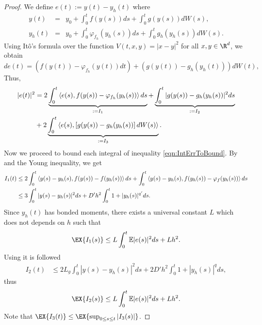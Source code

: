 \begin{proof}
	We define $e(t):= y(t)-y_h(t)$ where
	\begin{eqnarray*}
		y(t) &=& y_0 + \int_{0}^t f(y(s))ds + \int_{0}^t g(y(s))dW(s),  \nonumber\\
		y_h(t) &=& y_0 + \int_{0}^t \varphi_{f_h}(y_h(s))ds + \int_{0}^t 
		g_h(y_h(s))dW(s).\nonumber
	\end{eqnarray*}
	Using It\^{o}'s formula over the function $V(t,x,y) = |x-y|^2$ for all  $x,y\in \R^d$, we obtain 
$$
		d e(t) = 
		\left(
			f(y(t)) - \varphi_{f_h}(y(t)) dt
		\right)
		+
		\left(
			g(y(t)) - g_h(y_h(t))
		\right) dW(t),
	$$
	Thus,
	\begin{align} \label{eqn:IntErrToBound}
		|e(t)|^2 
		&=
			2 \underbrace{\int_{0}^t
				\left\langle e(s), f(y(s))-\varphi_{f_h}(y_h(s))\right\rangle ds }_{:=I_1}
			+
			\underbrace{\int_{0}^t
				|g(y(s)) - g_h(y_h(s))|^2 ds }_{:=I_2}\notag\\
		&+
			2 \underbrace{\int_{0}^t
				\left\langle e(s), \left[ g(y(s))-g_h(y_h(s)) \right] dW(s)\right\rangle}_{:=I_3}.	\end{align}
	Now we proceed to bound each integral of inequality \eqref{eqn:IntErrToBound}. 
	By  and the Young inequality, we get
	\begin{align*}
		I_1(t) 
		&\leq
			2\int_0^t
				\innerprod{y(s) - y_h(s)}{f(y(s))-f(y_h(s))} ds
			+
			 \int_0^t
				 \innerprod{y(s) - y_h(s)}{f(y_h(s))-\varphi_{f}(y_h(s))} ds \notag\\
%	
		&\leq
			3\int_0^t
				|y(s) - y_h(s)|^2ds
			+ D' h^2 
			\int_0^t
				1 + |y_h(s)|^{q'} ds.
	\end{align*}
	Since $y_h(t)$ has bonded moments, there exists a universal constant $L$ which does not depends on $h$ 
	such that
	\begin{equation}\label{eqn:I1Bound} 
		 \EX{
			 I_1(s)	
		 }
		 \leq
			 L\int_{0}^t
				\m{|e(s)|^2} ds
		+ L h^2.
	 \end{equation}
	Using   it is followed
	\begin{align*}
		I_2(t) 
		&\leq
			2 L_g 
			\int_{0}^t
				|y(s) - y_h(s)|^2 ds
			+
			2D'h^2
			\int_0^t
				1 + |y_h(s)|^q ds, 	 
	\end{align*}
	thus
	\begin{equation} \label{t5}
		\EX{
			I_2(s)	
		}
		\leq
		L\int_{0}^t
		\m{|e(s)|^2} ds
		+ L h^2.
	\end{equation}
	Note that $\EX{ I_3(t)} \leq \EX{ 
				\sup_{0\leq s \leq t}
				|I_3(s)|
			}$.

\end{proof}
